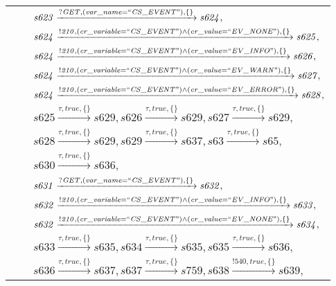\begin{tabular}{lcp{350px}}
& & $\mathit{s623}\xrightarrow{\mathit{?GET}, \mathit{(var\_name = ``CS\_EVENT")}, \{\}}\mathit{s624},$ \\
& & $\mathit{s624}\xrightarrow{\mathit{!210}, \mathit{(cr\_variable = ``CS\_EVENT") \land (cr\_value = ``EV\_NONE")}, \{\}}\mathit{s625},$ \\
& & $\mathit{s624}\xrightarrow{\mathit{!210}, \mathit{(cr\_variable = ``CS\_EVENT") \land (cr\_value = ``EV\_INFO")}, \{\}}\mathit{s626},$ \\
& & $\mathit{s624}\xrightarrow{\mathit{!210}, \mathit{(cr\_variable = ``CS\_EVENT") \land (cr\_value = ``EV\_WARN")}, \{\}}\mathit{s627},$ \\
& & $\mathit{s624}\xrightarrow{\mathit{!210}, \mathit{(cr\_variable = ``CS\_EVENT") \land (cr\_value = ``EV\_ERROR")}, \{\}}\mathit{s628},$ \\
& & $\mathit{s625}\xrightarrow{\mathit{\tau}, \mathit{true}, \{\}}\mathit{s629},\mathit{s626}\xrightarrow{\mathit{\tau}, \mathit{true}, \{\}}\mathit{s629},\mathit{s627}\xrightarrow{\mathit{\tau}, \mathit{true}, \{\}}\mathit{s629},$ \\
& & $\mathit{s628}\xrightarrow{\mathit{\tau}, \mathit{true}, \{\}}\mathit{s629},\mathit{s629}\xrightarrow{\mathit{\tau}, \mathit{true}, \{\}}\mathit{s637},\mathit{s63}\xrightarrow{\mathit{\tau}, \mathit{true}, \{\}}\mathit{s65},$ \\
& & $\mathit{s630}\xrightarrow{\mathit{\tau}, \mathit{true}, \{\}}\mathit{s636},$ \\
& & $\mathit{s631}\xrightarrow{\mathit{?GET}, \mathit{(var\_name = ``CS\_EVENT")}, \{\}}\mathit{s632},$ \\
& & $\mathit{s632}\xrightarrow{\mathit{!210}, \mathit{(cr\_variable = ``CS\_EVENT") \land (cr\_value = ``EV\_INFO")}, \{\}}\mathit{s633},$ \\
& & $\mathit{s632}\xrightarrow{\mathit{!210}, \mathit{(cr\_variable = ``CS\_EVENT") \land (cr\_value = ``EV\_NONE")}, \{\}}\mathit{s634},$ \\
& & $\mathit{s633}\xrightarrow{\mathit{\tau}, \mathit{true}, \{\}}\mathit{s635},\mathit{s634}\xrightarrow{\mathit{\tau}, \mathit{true}, \{\}}\mathit{s635},\mathit{s635}\xrightarrow{\mathit{\tau}, \mathit{true}, \{\}}\mathit{s636},$ \\
& & $\mathit{s636}\xrightarrow{\mathit{\tau}, \mathit{true}, \{\}}\mathit{s637},\mathit{s637}\xrightarrow{\mathit{\tau}, \mathit{true}, \{\}}\mathit{s759},\mathit{s638}\xrightarrow{\mathit{!540}, \mathit{true}, \{\}}\mathit{s639},$ \\

\end{tabular}
